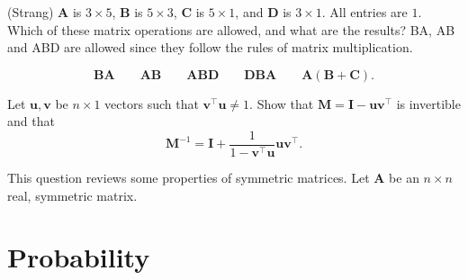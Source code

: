 \documentclass[answers,10pt]{exam}
\newcommand{\B}[1]{\boldsymbol{#1}}
\begin{document}
\begin{questions} 

\question [10] (Strang) $\B{A}$ is  $3\times 5$, $\B{B}$  is $5 \times 3$, $\B{C}$ is $5\times 1$, and $\B{D}$ is $3\times 1$. All entries are $1$. Which of these  matrix operations are allowed, and what are the results? 
BA, AB and ABD are allowed since they follow the rules of matrix multiplication. 

\[ \B{BA} \qquad \B{AB} \qquad \B{ABD} \qquad \B{DBA} \qquad \B{A}(\B{B}+\B{C}) .\]

\question [10] Let $\B{u}, \B{v}$ be $n\times 1$ vectors such that $\B{v}^\top \B{u} \neq 1$. Show that $\B{M} = \B{I}-\B{uv}^\top$ is invertible and that $$\B{M}^{-1} = \B{I} + \frac{1}{1-\B{v}^\top \B{u}}\B{uv}^\top.$$

\question [10] This question reviews some properties of symmetric matrices. Let $\B{A}$ be an $n\times n$ real, symmetric matrix.


\end{questions}

\section*{Probability}
\end{document}
